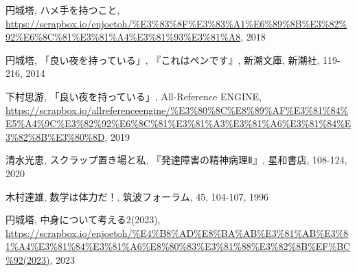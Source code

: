 \documentclass[10pt, a5paper, twoside]{jsarticle}
\theoremstyle{definition}
\begin{document}
	\begin{thebibliography}{99}

		 円城塔, ハメ手を持つこと, \url{https://scrapbox.io/enjoetoh/%E3%83%8F%E3%83%A1%E6%89%8B%E3%82%92%E6%8C%81%E3%81%A4%E3%81%93%E3%81%A8}, 2018

		 円城塔, 「良い夜を持っている」, 『これはペンです』, 新潮文庫, 新潮社, 119-216, 2014

		 下村思游, 「良い夜を持っている」, All-Reference ENGINE, \url{https://scrapbox.io/allreferenceengine/%E3%80%8C%E8%89%AF%E3%81%84%E5%A4%9C%E3%82%92%E6%8C%81%E3%81%A3%E3%81%A6%E3%81%84%E3%82%8B%E3%80%8D}, 2019

		 清水光恵, スクラップ置き場と私, 『発達障害の精神病理Ⅱ』, 星和書店, 108-124, 2020

		 木村達雄, 数学は体力だ！, 筑波フォーラム, 45, 104-107, 1996

		 円城塔, 中身について考える2(2023), \url{https://scrapbox.io/enjoetoh/%E4%B8%AD%E8%BA%AB%E3%81%AB%E3%81%A4%E3%81%84%E3%81%A6%E8%80%83%E3%81%88%E3%82%8B%EF%BC%92(2023)}, 2023

	\end{thebibliography}
\end{document}
